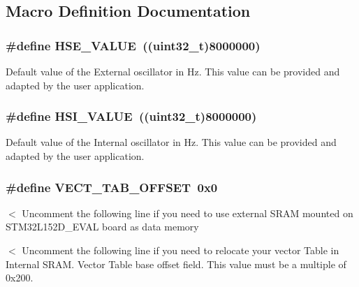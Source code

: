 \subsection{Macro Definition Documentation}
\hypertarget{group___s_t_m32_l1xx___system___private___defines_gaeafcff4f57440c60e64812dddd13e7cb}{
\subsubsection[{H\-S\-E\-\_\-\-V\-A\-L\-U\-E}]{\setlength{\rightskip}{0pt plus 5cm}\#define H\-S\-E\-\_\-\-V\-A\-L\-U\-E~((uint32\-\_\-t)8000000)}}\label{group___s_t_m32_l1xx___system___private___defines_gaeafcff4f57440c60e64812dddd13e7cb}
Default value of the External oscillator in Hz. This value can be provided and adapted by the user application. \hypertarget{group___s_t_m32_l1xx___system___private___defines_gaaa8c76e274d0f6dd2cefb5d0b17fbc37}{
\subsubsection[{H\-S\-I\-\_\-\-V\-A\-L\-U\-E}]{\setlength{\rightskip}{0pt plus 5cm}\#define H\-S\-I\-\_\-\-V\-A\-L\-U\-E~((uint32\-\_\-t)8000000)}}\label{group___s_t_m32_l1xx___system___private___defines_gaaa8c76e274d0f6dd2cefb5d0b17fbc37}
Default value of the Internal oscillator in Hz. This value can be provided and adapted by the user application. \hypertarget{group___s_t_m32_l1xx___system___private___defines_ga40e1495541cbb4acbe3f1819bd87a9fe}{
\subsubsection[{V\-E\-C\-T\-\_\-\-T\-A\-B\-\_\-\-O\-F\-F\-S\-E\-T}]{\setlength{\rightskip}{0pt plus 5cm}\#define V\-E\-C\-T\-\_\-\-T\-A\-B\-\_\-\-O\-F\-F\-S\-E\-T~0x0}}\label{group___s_t_m32_l1xx___system___private___defines_ga40e1495541cbb4acbe3f1819bd87a9fe}
$<$ Uncomment the following line if you need to use external S\-R\-A\-M mounted on S\-T\-M32\-L152\-D\-\_\-\-E\-V\-A\-L board as data memory

$<$ Uncomment the following line if you need to relocate your vector Table in Internal S\-R\-A\-M. Vector Table base offset field. This value must be a multiple of 0x200. 